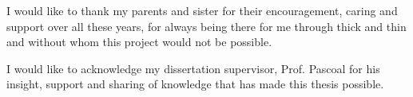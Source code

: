 
I would like to thank my parents and sister for their encouragement, caring and support over all these years, for always being there for me through thick and thin and without whom this project would not be possible.

I would like to acknowledge my dissertation supervisor, Prof. Pascoal for his insight, support and sharing of knowledge that has made this thesis possible.



